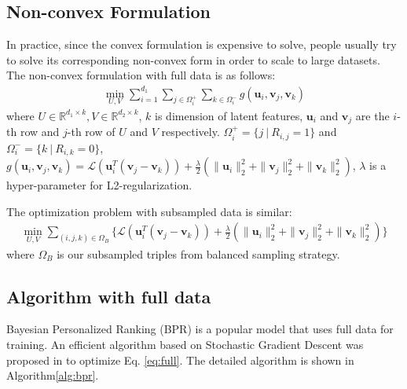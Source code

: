 \documentclass[conference]{IEEEtran}
\numberwithin{equation}{section}
\newcommand{\R}{\mathbb{R}}
\newtheorem{sampling strategy}{Sampling Strategy}
\begin{document}
\subsection{Non-convex Formulation}

In practice, since the convex formulation is expensive to solve, people usually try to solve its corresponding non-convex form in order to scale to  large datasets. The non-convex formulation with full data is as follows: 
\begin{equation}
    \begin{aligned}
        \underset{U,V}{\min} \sum_{i=1}^{d_1} \underset{j \in \Omega_i^+}{\sum} \underset{k \in \Omega_i^-}{\sum} g(\bm{u}_i,\bm{v}_j,\bm{v}_k)
        \label{eq:full}
    \end{aligned}
\end{equation}
where $U \in \R^{d_1 \times k}, V \in \R^{d_2 \times k}$, $k$ is dimension of latent features, $\bm{u}_i$ and $\bm{v}_j$ are the $i$-th row and $j$-th row of $U$ and $V$ respectively. $\Omega_i^+ = \{j ~|~ R_{i,j} = 1\}$ and $\Omega_i^- = \{k ~|~ R_{i,k} = 0\}$, $\displaystyle g(\bm{u}_i,\bm{v}_j,\bm{v}_k) = \mathcal{L}( \bm{u}_i^T(\bm{v}_j - \bm{v}_k) ) + \frac{\lambda}{2} (\|\bm{u}_i\|_2^2 + \|\bm{v}_j\|_2^2 + \|\bm{v}_k\|_2^2 )$, $\lambda$ is a hyper-parameter for L2-regularization.

The optimization problem with subsampled data is similar:
\begin{equation}
    \begin{aligned}
        \underset{U,V}{\min} \underset{(i,j,k) \in \Omega_B}{\sum}  \big\{ \mathcal{L}( \bm{u}_i^T(\bm{v}_j - \bm{v}_k) ) + \frac{\lambda}{2} (\|\bm{u}_i\|_2^2 + \|\bm{v}_j\|_2^2 + \|\bm{v}_k\|_2^2 ) \big\}
        \label{eq:sub}
    \end{aligned}
\end{equation}
where $\Omega_B$ is our subsampled triples from balanced sampling strategy.


\subsection{Algorithm with full data}

Bayesian Personalized Ranking (BPR) is a popular model that uses  full data for training. An efficient algorithm based on Stochastic Gradient Descent was proposed in \cite{bpr} to optimize Eq.  \ref{eq:full}. The detailed algorithm is shown in Algorithm\ref{alg:bpr}.
\end{document}
